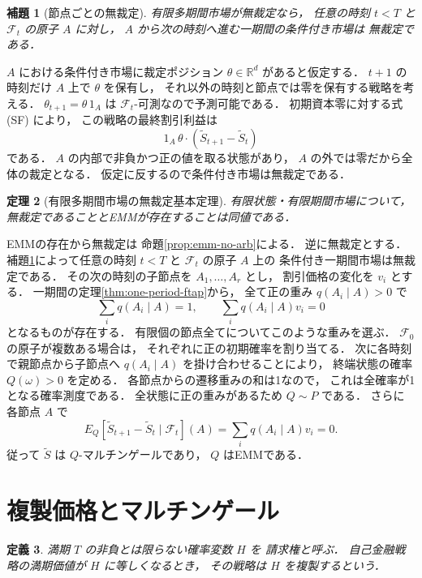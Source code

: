 \documentclass[a5paper,10pt,onecolumn]{jsarticle}
\makeatletter
\theoremstyle{mathnotetheorem}
\newtheorem{theorem}{定理}[section]
\newtheorem{definition}[theorem]{定義}
\newtheorem{lemma}[theorem]{補題}
\renewcommand{\proofname}{証明}
\renewenvironment{proof}[1][\proofname]{%
  \par\pushQED{\qed}\normalfont\topsep4\p@\@plus2\p@\relax
  \trivlist\item[\hskip\labelsep\bfseries #1]\ignorespaces
}{\popQED\endtrivlist\@endpefalse}
\makeatother
\begin{document}
\begin{lemma}[節点ごとの無裁定]\label{lem:local-na}
有限多期間市場が無裁定なら，
任意の時刻 $t<T$ と $\mathcal F_t$ の原子 $A$ に対し，
$A$ から次の時刻へ進む一期間の条件付き市場は
無裁定である．
\end{lemma}
\begin{proof}
$A$ における条件付き市場に裁定ポジション
$\theta\in\mathbb R^d$ があると仮定する．
$t+1$ の時刻だけ $A$ 上で $\theta$ を保有し，
それ以外の時刻と節点では零を保有する戦略を考える．
$\theta_{t+1}=\theta\,1_A$ は
$\mathcal F_t$-可測なので予測可能である．
初期資本零に対する式 (SF) により，
この戦略の最終割引利益は
\[
 1_A\,\theta\cdot
 (\widetilde S_{t+1}-\widetilde S_t)
\]
である．
$A$ の内部で非負かつ正の値を取る状態があり，
$A$ の外では零だから全体の裁定となる．
仮定に反するので条件付き市場は無裁定である．
\end{proof}

\begin{theorem}[有限多期間市場の無裁定基本定理]
\label{thm:finite-ftap}
有限状態・有限期間市場について，
無裁定であることとEMMが存在することは同値である．
\end{theorem}
\begin{proof}
EMMの存在から無裁定は
命題\ref{prop:emm-no-arb}による．
逆に無裁定とする．
補題\ref{lem:local-na}によって任意の時刻
$t<T$ と $\mathcal F_t$ の原子 $A$ 上の
条件付き一期間市場は無裁定である．
その次の時刻の子節点を
$A_1,\dots,A_r$ とし，
割引価格の変化を $v_i$ とする．
一期間の定理\ref{thm:one-period-ftap}から，
全て正の重み $q(A_i\mid A)>0$ で
\[
 \sum_iq(A_i\mid A)=1,\qquad
 \sum_iq(A_i\mid A)v_i=0
\]
となるものが存在する．
有限個の節点全てについてこのような重みを選ぶ．
$\mathcal F_0$ の原子が複数ある場合は，
それぞれに正の初期確率を割り当てる．
次に各時刻で親節点から子節点へ
$q(A_i\mid A)$ を掛け合わせることにより，
終端状態の確率 $Q(\omega)>0$ を定める．
各節点からの遷移重みの和は1なので，
これは全確率が1となる確率測度である．
全状態に正の重みがあるため $Q\sim P$ である．
さらに各節点 $A$ で
\[
 E_Q[\widetilde S_{t+1}-\widetilde S_t
       \mid\mathcal F_t](A)
 =\sum_iq(A_i\mid A)v_i=0.
\]
従って $\widetilde S$ は $Q$-マルチンゲールであり，
$Q$ はEMMである．
\end{proof}

\section{複製価格とマルチンゲール}

\begin{definition}
満期 $T$ の非負とは限らない確率変数 $H$ を
\emph{請求権}と呼ぶ．
自己金融戦略の満期価値が $H$ に等しくなるとき，
その戦略は $H$ を\emph{複製}するという．
\end{definition}
\end{document}
